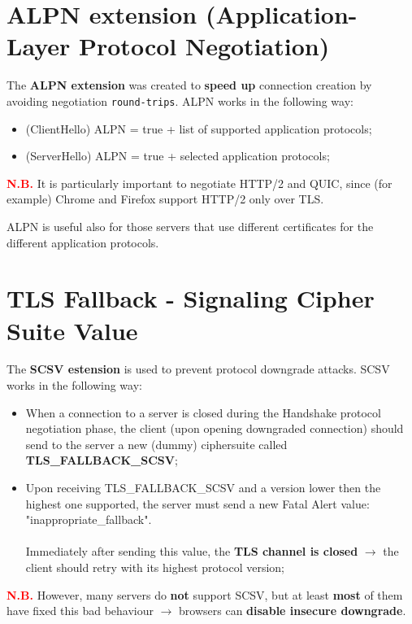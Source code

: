 \section{ALPN extension (Application-Layer Protocol Negotiation)}
The \textbf{ALPN extension} was created to \textbf{speed up} connection creation by avoiding negotiation \texttt{round-trips}. ALPN works in the following way:
\begin{itemize}
    \item (ClientHello) ALPN = true + list of supported application protocols;
    \item (ServerHello) ALPN = true + selected application protocols;
\end{itemize}
\textcolor{red}{\textbf{N.B.}} It is particularly important to negotiate HTTP/2 and QUIC, since (for example)
Chrome and Firefox support HTTP/2 only over TLS.
\begin{quotebox-yellow}{}
    ALPN is useful also for those servers that use different certificates for the different application
    protocols.
\end{quotebox-yellow}

\section{TLS Fallback - Signaling Cipher Suite Value}
The \textbf{SCSV estension} is used to prevent protocol downgrade attacks. SCSV works in the following way:
\begin{itemize}
    \item When a connection to a server is closed during the Handshake protocol negotiation
    phase, the client (upon opening downgraded connection) should send to the server a
    new (dummy) ciphersuite called \textbf{TLS\_FALLBACK\_SCSV};
    \item Upon receiving TLS\_FALLBACK\_SCSV and a version lower then the highest one supported, the server must send a new Fatal Alert value: "inappropriate\_fallback".\\
    \\
    Immediately after sending this value, the \textbf{TLS channel is closed} \(\rightarrow\) the client should
    retry with its highest protocol version;
\end{itemize}
\textcolor{red}{\textbf{N.B.}} However, many servers do \textbf{not} support SCSV, but at least \textbf{most} of them have fixed this bad behaviour \(\rightarrow\) browsers can \textbf{disable insecure downgrade}.

